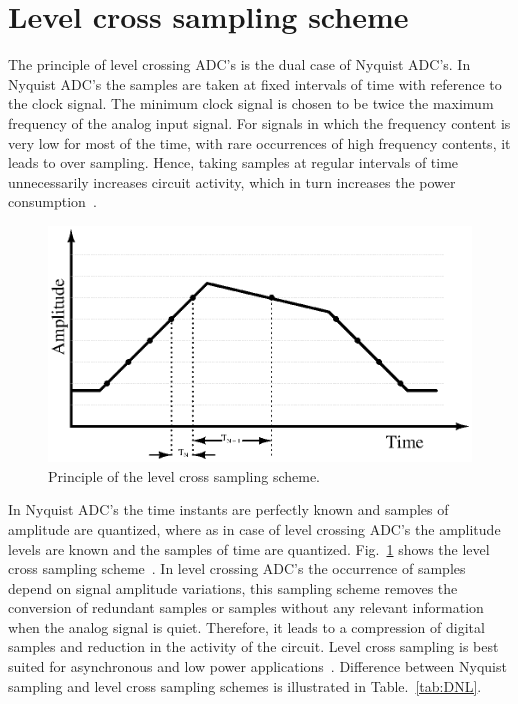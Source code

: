 \section{Level cross sampling scheme}

\par
\hspace{0.6cm} The principle of level crossing ADC's is the dual case of Nyquist ADC's. In Nyquist \mbox{ADC's} the samples are taken at fixed intervals of time with reference to the clock signal. The minimum clock signal is chosen to be twice the maximum frequency of the analog input signal. For signals in which the frequency content is very low for most of the time, with rare occurrences of high frequency contents, it leads to over sampling. Hence, taking samples at regular intervals of time unnecessarily increases circuit activity, which in turn increases the power consumption~\cite{sayiner1996level}. 

\begin{figure}[H]
	\begin{center}
		\includegraphics[scale=0.75]{./Figures/LCS.ps}
		\caption{Principle of the level cross sampling scheme. }
		\label{fig:LCS}
	\end{center}
\end{figure}

\par
\hspace{1.2cm} In Nyquist ADC's the time instants are perfectly known and samples of amplitude are quantized, where as in case of level crossing ADC's the amplitude levels are known and the samples of time are quantized. Fig.~\ref{fig:LCS} shows the level cross sampling scheme~\cite{1595684}. In level crossing ADC's the occurrence of samples depend on signal amplitude variations, this sampling scheme removes the conversion of redundant samples or samples without any relevant information when the analog signal is quiet. Therefore, it leads to a compression of digital samples and reduction in the activity of the circuit. Level cross sampling is best suited for asynchronous and low power applications~\cite{allier2003new}. Difference between Nyquist sampling and level cross sampling schemes is illustrated in Table.~\ref{tab:DNL}. 

